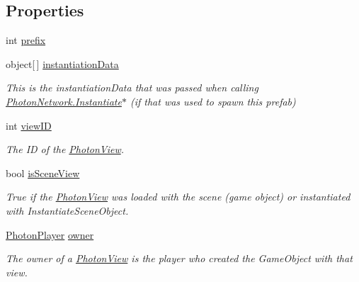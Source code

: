 \subsection*{Properties}
\begin{DoxyCompactItemize}
\item 
int \hyperlink{class_photon_view_aae1e4dcb7cf0cf2cd460490cefdcda46}{prefix}
\item 
object\mbox{[}$\,$\mbox{]} \hyperlink{class_photon_view_a0d1e63579ed533e6394ca7f12b313c7c}{instantiation\+Data}
\begin{DoxyCompactList}\small\item\em This is the instantiation\+Data that was passed when calling \hyperlink{class_photon_network_a843d9f62d28ab123c83291c1e6bb857d}{Photon\+Network.\+Instantiate}$\ast$ (if that was used to spawn this prefab) \end{DoxyCompactList}\item 
int \hyperlink{class_photon_view_a309ddedb443400696cf80da2ff579262}{view\+ID}
\begin{DoxyCompactList}\small\item\em The ID of the \hyperlink{class_photon_view}{Photon\+View}. \end{DoxyCompactList}\item 
bool \hyperlink{class_photon_view_a65ea130a5d46f64984ff5361518f6050}{is\+Scene\+View}
\begin{DoxyCompactList}\small\item\em True if the \hyperlink{class_photon_view}{Photon\+View} was loaded with the scene (game object) or instantiated with Instantiate\+Scene\+Object. \end{DoxyCompactList}\item 
\hyperlink{class_photon_player}{Photon\+Player} \hyperlink{class_photon_view_ad696cb93fb9835d633b9def970650edc}{owner}
\begin{DoxyCompactList}\small\item\em The owner of a \hyperlink{class_photon_view}{Photon\+View} is the player who created the Game\+Object with that view. \end{DoxyCompactList}\item 

\end{DoxyCompactItemize}
